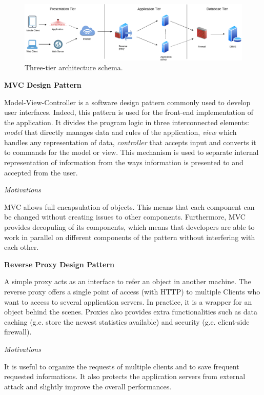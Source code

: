 \documentclass{report}
\begin{document}
\begin{figure}[!ht]
	\begin{center}
	\includegraphics[width=\textwidth]{img/TiersArchitecture.png}
	\end{center}
	\caption{Three-tier architecture schema.}
\end{figure}

\begin{center}\large{\textbf{MVC Design Pattern}}\end{center}
Model-View-Controller is a software design pattern commonly used to develop user interfaces. Indeed, this pattern is used for the front-end implementation of the application. It divides the program logic in three interconnected elements: \textit{model} that directly manages data and rules of the application, \textit{view} which handles any representation of data, \textit{controller} that 
accepts input and converts it to commands for the model or view. This mechanism is used to separate internal representation of information from the ways information is presented to and accepted from the user. 
\begin{center}\large{\textit{Motivations}}\end{center} 
MVC allows full encapsulation of objects. This means that each component can be changed without creating issues to other components.
Furthermore, MVC provides decopuling of its components, which means that developers are able to work in parallel on different components of the pattern without interfering with each other.

\begin{center}\large{\textbf{Reverse Proxy Design Pattern}}\end{center}
A simple proxy acts as an interface to refer an object in another machine. The reverse proxy offers a single point of access (with HTTP) to multiple Clients who want to access to several application servers. In practice, it is a wrapper for an object behind the scenes. 
Proxies also provides extra functionalities such as data caching (g.e. store the newest statistics available) and security (g.e. client-side firewall).
\begin{center}\large{\textit{Motivations}}\end{center} 
It is useful to organize the requests of multiple clients and to save frequent requested informations. It also protects the application servers from external attack and slightly improve the overall performances.
\end{document}
